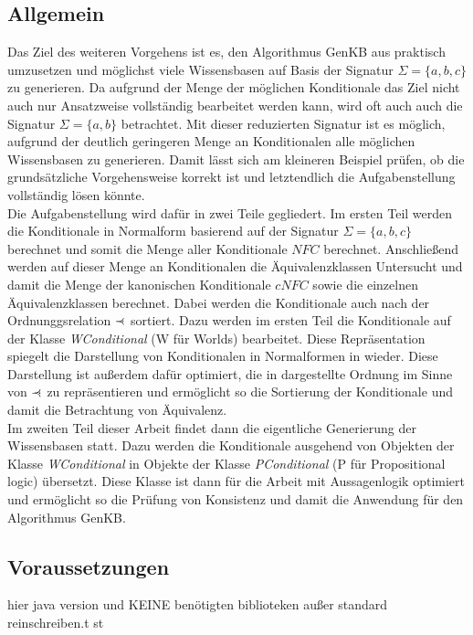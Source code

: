 \documentclass[12pt,a4paper]{article}
\newcommand\rdotl{\mathrel{%
    \mathchoice{\RQEQ}{\RQEQ}{\RQEQ}{\RQEQ}%
}}
\def\RQEQ{{%
    \setbox0\hbox{$\prec$}%
    \rlap{\hbox to \wd0{\hss \raisebox {0.01pt}{$\ \cdot$\hss}}}\box0
}}
\begin{document}
\subsection{Allgemein}
Das Ziel des weiteren Vorgehens ist es, den Algorithmus GenKB aus \cite{beierle19} praktisch umzusetzen und möglichst viele Wissensbasen auf Basis der Signatur $\Sigma=\{a,b,c\}$ zu generieren. Da aufgrund der Menge der möglichen Konditionale das Ziel nicht auch nur Ansatzweise vollständig bearbeitet werden kann, wird oft auch auch die Signatur $\Sigma=\{a,b\}$ betrachtet. Mit dieser reduzierten Signatur ist es möglich, aufgrund der deutlich geringeren Menge an Konditionalen alle möglichen Wissensbasen zu generieren. Damit lässt sich am kleineren Beispiel prüfen, ob die grundsätzliche Vorgehensweise korrekt ist und letztendlich die Aufgabenstellung vollständig lösen könnte. \\
Die Aufgabenstellung wird dafür in zwei Teile gegliedert. Im ersten Teil werden die Konditionale in Normalform basierend auf der Signatur $\Sigma=\{a,b,c\}$ berechnet und somit die Menge aller Konditionale $NFC$  berechnet. Anschließend werden auf dieser Menge an Konditionalen die Äquivalenzklassen Untersucht und damit die Menge der kanonischen Konditionale $cNFC$ sowie die einzelnen Äquivalenzklassen berechnet. Dabei werden die Konditionale auch nach der Ordnunggsrelation $\rdotl$ sortiert. Dazu werden im ersten Teil die Konditionale auf der Klasse \textit{WConditional} (W für Worlds) bearbeitet. Diese Repräsentation spiegelt die Darstellung von Konditionalen in Normalformen in \cite{beierle19} wieder. Diese Darstellung ist außerdem dafür optimiert, die in \cite{beierle19} dargestellte Ordnung im Sinne von $\rdotl$ zu repräsentieren und ermöglicht so die Sortierung der Konditionale und damit die Betrachtung von Äquivalenz. \\
Im zweiten Teil dieser Arbeit findet dann die eigentliche Generierung der Wissensbasen statt. Dazu werden die Konditionale ausgehend von Objekten der Klasse \textit{WConditional} in Objekte der Klasse \textit{PConditional} (P für Propositional logic) übersetzt. Diese Klasse ist dann für die Arbeit mit Aussagenlogik optimiert und ermöglicht so die Prüfung von Konsistenz und damit die Anwendung für den Algorithmus GenKB.


\subsection{Voraussetzungen}
hier java version und KEINE benötigten biblioteken außer standard reinschreiben.t st
\end{document}
